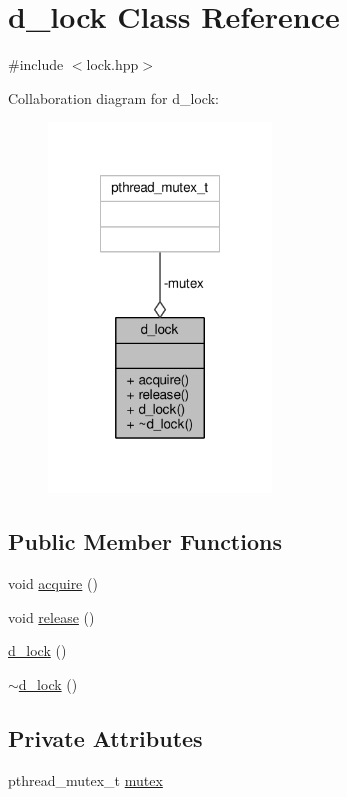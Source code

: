 \hypertarget{classd__lock}{\section{d\-\_\-lock Class Reference}
\label{classd__lock}
}


{\ttfamily \#include $<$lock.\-hpp$>$}



Collaboration diagram for d\-\_\-lock\-:
\nopagebreak
\begin{figure}[H]
\begin{center}
\leavevmode
\includegraphics[width=168pt]{classd__lock__coll__graph}
\end{center}
\end{figure}
\subsection*{Public Member Functions}
\begin{DoxyCompactItemize}
\item 
void \hyperlink{classd__lock_a3798ee1bd60b0591cc7d5ff8a0303a77}{acquire} ()
\item 
void \hyperlink{classd__lock_a7e35eeba3c1119f9d699385229eb508f}{release} ()
\item 
\hyperlink{classd__lock_a64994179674bb134d7f5c0555f68dd18}{d\-\_\-lock} ()
\item 
\hyperlink{classd__lock_ab48b85f9b873ac807865affbcd78e23d}{$\sim$d\-\_\-lock} ()
\end{DoxyCompactItemize}
\subsection*{Private Attributes}
\begin{DoxyCompactItemize}
\item 
pthread\-\_\-mutex\-\_\-t \hyperlink{classd__lock_aa4851f2b2a91c74ccacf23b1c5b97332}{mutex}
\end{DoxyCompactItemize}


